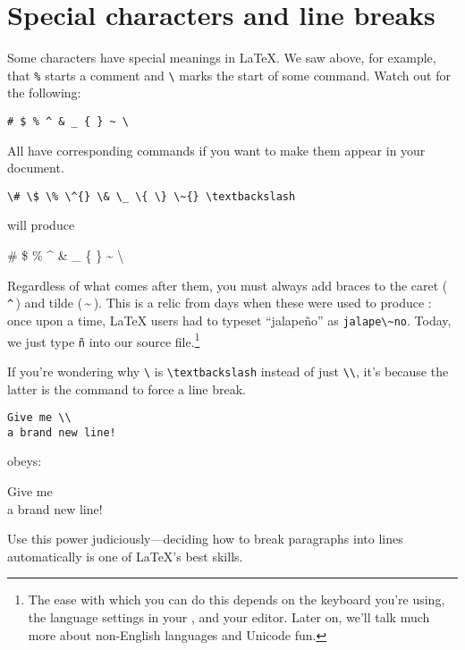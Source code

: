 \section{Special characters and line breaks}

Some characters have special meanings in \LaTeX.
We saw above, for example, that \verb|%| starts a comment
and \verb|\| marks the start of some command.
Watch out for the following:
\begin{leftfigure}
\begin{lstlisting}
# $ % ^ & _ { } ~ \
\end{lstlisting}
\end{leftfigure}
All have corresponding commands
if you want to make them appear in your document.
\begin{leftfigure}
\begin{lstlisting}
\# \$ \% \^{} \& \_ \{ \} \~{} \textbackslash
\end{lstlisting}
\end{leftfigure}
will produce
\begin{leftfigure}
\lm \# \$ \% \^{} \& \_ \{ \} \~{} \textbackslash
\end{leftfigure}
Regardless of what comes after them, you must always add braces to
the caret (\,\texttt{\^{}}\,) and tilde (\,\~{}\,).
This is a relic from days when these were used to produce
:
once upon a time, \LaTeX{} users had to typeset ``jalapeño'' as
\verb|jalape\~no|.
Today, we just type \texttt{ñ} into our source
file.\punckern\footnote{The ease with which you can do this depends
on the keyboard you're using, the language settings in your ,
and your editor.
Later on, we'll talk much more about non-English languages and Unicode fun.}

If you're wondering why \texttt{\textbackslash} is \verb|\textbackslash|
instead of just \verb|\\|, it's because the latter is the command to force
a line break.
\begin{leftfigure}
\begin{lstlisting}
Give me \\
a brand new line!
\end{lstlisting}
\end{leftfigure}
obeys:
\begin{leftfigure}
\lm Give me \\
a brand new line!
\end{leftfigure}
Use this power judiciously---deciding how to break paragraphs into lines
automatically is one of \LaTeX{}'s best skills.
